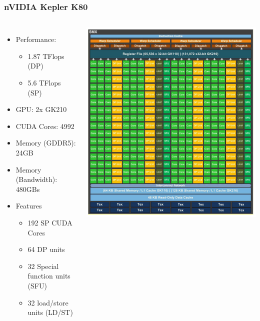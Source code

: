 \documentclass[10pt,t]{beamer}
\begin{document}
\begin{frame}
  \frametitle{nVIDIA Kepler K80}
  \begin{columns}[c]
    \begin{itemize}
    \item Performance: 
      \begin{itemize}
      \item 1.87 TFlops (DP)
      \item 5.6 TFlops (SP)
      \end{itemize}
    \item GPU: 2x GK210
    \item CUDA Cores: 4992
    \item Memory (GDDR5): 24GB
    \item Memory (Bandwidth): 480GBs
    \item Features
      \begin{itemize}
      \item 192 SP CUDA Cores
      \item 64 DP units
      \item 32 Special function units (SFU)
      \item 32 load/store units (LD/ST)
      \end{itemize}
    \end{itemize}
    \includegraphics[width=\textwidth]{./GK210-110}
  \end{columns}
\end{frame}
\end{document}
